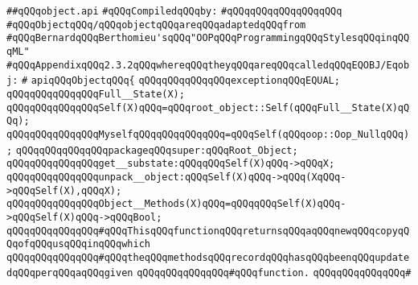 \label{src/lib/src/object.api}
\verb|##qQQqobject.api|\newline
\newline
\verb|#qQQqCompiledqQQqby:|\newline
\verb|#qQQqqQQqqQQqqQQqqQQq|\newline
\newline
\verb|#qQQqObjectqQQq/qQQqobjectqQQqareqQQqadaptedqQQqfrom|\newline
\verb|#qQQqBernardqQQqBerthomieu'sqQQq"OOPqQQqProgrammingqQQqStylesqQQqinqQQqML"|\newline
\verb|#qQQqAppendixqQQq2.3.2qQQqwhereqQQqtheyqQQqareqQQqcalledqQQqEQOBJ/Eqobj:|\newline
\verb|#|\newline
\verb|apiqQQqObjectqQQq{|\newline
\newline
\verb|qQQqqQQqqQQqqQQqexceptionqQQqEQUAL;|\newline
\newline
\verb|qQQqqQQqqQQqqQQqFull__State(X);|\newline
\verb|qQQqqQQqqQQqqQQqSelf(X)qQQq=qQQqroot_object::Self(qQQqFull__State(X)qQQq);|\newline
\verb|qQQqqQQqqQQqqQQqMyselfqQQqqQQqqQQqqQQq=qQQqSelf(qQQqoop::Oop_NullqQQq);|\newline
\newline
\verb|qQQqqQQqqQQqqQQqpackageqQQqsuper:qQQqRoot_Object;|\newline
\newline
\verb|qQQqqQQqqQQqqQQqget__substate:qQQqqQQqSelf(X)qQQq->qQQqX;|\newline
\verb|qQQqqQQqqQQqqQQqunpack__object:qQQqSelf(X)qQQq->qQQq(XqQQq->qQQqSelf(X),qQQqX);|\newline
\newline
\verb|qQQqqQQqqQQqqQQqObject__Methods(X)qQQq=qQQqqQQqSelf(X)qQQq->qQQqSelf(X)qQQq->qQQqBool;|\newline
\newline
\verb|qQQqqQQqqQQqqQQq#qQQqThisqQQqfunctionqQQqreturnsqQQqaqQQqnewqQQqcopyqQQqofqQQqusqQQqinqQQqwhich|\newline
\verb|qQQqqQQqqQQqqQQq#qQQqtheqQQqmethodsqQQqrecordqQQqhasqQQqbeenqQQqupdatedqQQqperqQQqaqQQqgiven|\newline
\verb|qQQqqQQqqQQqqQQq#qQQqfunction.|\newline
\verb|qQQqqQQqqQQqqQQq#|\newline

